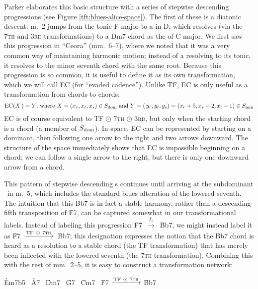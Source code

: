 Parker elaborates this basic structure with a series of stepwise descending
\tf progressions (see Figure \ref{tft:blues-alice-space}). The first of
these is a diatonic descent: m.~2 jumps from the tonic F  major to a \tf in D,
which resolves (via the \textsc{7th} and \textsc{3rd} transformations) to a
\h{Dm7} chord as the \ii of C major. We first saw this progression in
``Ceora'' (mm.~6--7), where we noted that it was a very common way of
maintaining harmonic motion; instead of a \tf resolving to its tonic, it resolves
to the minor seventh chord with the same root. Because this progression is so
common, it is useful to define it as its own transformation, which we will
call EC (for ``evaded cadence''). Unlike TF, EC is only useful as a
transformation from \V chords to \ii chords:
%
{\novspace%
\begin{displaymath}
  \mathrm{EC}(X\,) = Y\text{, where}\ X = (x_r, x_t, x_s) \in S_{\mathrm{dom}}
   \text{ and}\
  Y = (\,y_r, y_t, y_s) = (x_r + 5, x_s - 2, x_t - 1) \in S_{\mathrm{min}}
\end{displaymath}}%
%
EC is of course equivalent to TF $\odot$ \textsc{7th} $\odot$ \textsc{3rd},
but only when the starting chord is a \V chord (a member of $S_{\mathrm{dom}}$).
In \tf space, EC can be represented by starting on a dominant, then following
one arrow to the right and two arrows downward. The structure of the space
immediately shows that EC is impossible beginning on a \ii chord; we
can follow a single arrow to the right, but there is only one downward arrow
from a \V chord.\fn{tft-7}

This pattern of stepwise descending \tf{}s continues until arriving at the
subdominant \Bflat\ in m.~5, which includes the standard blues alteration of
the lowered seventh.\fn{tft-6} The intuition that this \h{Bb7} is in fact a
stable harmony, rather than a descending-fifth transposition of \h{F7}, can be
captured somewhat in our transformational labels. Instead of labeling this progression
\mbox{\h{F7} $\xrightarrow{T_5}$ \h{Bb7}}, we might instead label it as
\mbox{\h{F7} $\xrightarrow{\mathrm{TF}\ \odot\ \text{\textsc{7th}}}$ \h{Bb7}};
this designation expresses the notion that the \h{Bb7} chord is heard as a
resolution to a stable chord (the TF transformation) that has merely been
inflected with the lowered seventh (the \textsc{7th} transformation).
Combining this with the rest of mm.~2--5, it is easy to construct a
transformation network:

\begin{center}
  \h{Em7b5} \TFarrow\ \h{A7} \ECarrow\
  \h{Dm7}   \TFarrow\ \h{G7} \ECarrow\
  \h{Cm7}   \TFarrow\ \h{F7} $\xrightarrow{\mathrm{TF}\ \odot\ \text{\textsc{7th}}}$
  \h{Bb7}
\end{center}

